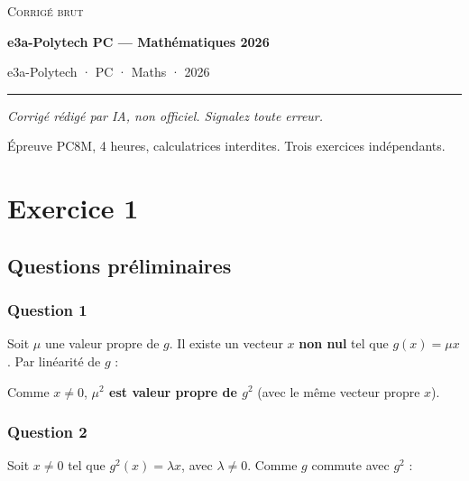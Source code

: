 \documentclass[11pt,a4paper]{article}
\newcommand{\equationajustee}[1]{%
  \sbox{\boiteequation}{$\displaystyle #1$}%
  \ifdim\wd\boiteequation>\linewidth
    \[\resizebox{\linewidth}{!}{\usebox{\boiteequation}}\]%
  \else
    \[#1\]%
  \fi}
\begin{document}
\thispagestyle{plain}
\begin{center}
  {\small\scshape Corrigé brut}\par\smallskip
  {\LARGE\bfseries e3a-Polytech PC — Mathématiques 2026\par}\medskip
  {\large e3a-Polytech · PC · Maths · 2026\par}
\end{center}
\vspace{2pt}\hrule\vspace{8pt}

\emph{Corrigé rédigé par IA, non officiel. Signalez toute erreur.}

Épreuve PC8M, 4 heures, calculatrices interdites. Trois exercices indépendants.

\hypertarget{exercice-1}{%
\section{Exercice 1}\label{exercice-1}}

\hypertarget{questions-pruxe9liminaires}{%
\subsection{Questions préliminaires}\label{questions-pruxe9liminaires}}

\hypertarget{question-1}{%
\subsubsection{Question 1}\label{question-1}}

Soit \(\mu\) une valeur propre de \(g\). Il existe un vecteur \(x\) \textbf{non nul} tel que \(g(x)=\mu x\). Par linéarité de \(g\) :

\equationajustee{\begin{aligned}
g^2(x)&=g(\mu x)\\
&=\mu\,g(x)\\
&=\mu^2x.
\end{aligned}}

Comme \(x\neq0\), \textbf{\(\mu^2\) est valeur propre de \(g^2\)} (avec le même vecteur propre \(x\)).

\hypertarget{question-2}{%
\subsubsection{Question 2}\label{question-2}}

Soit \(x\neq0\) tel que \(g^2(x)=\lambda x\), avec \(\lambda\neq0\). Comme \(g\) commute avec \(g^2\) :
\end{document}
